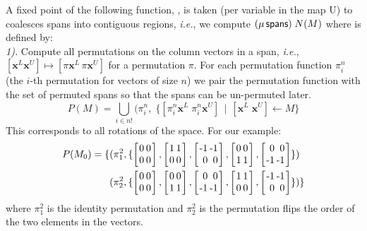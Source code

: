 \documentclass[9pt]{sigplanconf}
\theoremstyle{definition}
\newcommand{\ie}{\emph{i.e.}}
\newcommand{\vect}[1]{\textbf{#1}}
\newcommand{\vtwo}[2]{\setlength{\arraycolsep}{0em}
\left[\begin{array}{l}#1\\#2\end{array}\right]}
\newcommand{\stwo}[4]
{\setlength{\arraycolsep}{0.1em}
\left[\begin{array}{rr}$#1$ & $#3$\\$#2$ & $#4$\end{array}\right]}
\begin{document}
A fixed point of the following function, \spanOp{}, is taken (per variable
in the map U) to coalesces spans into contiguous regions, \ie{}, we compute
 $(\mu \, \textsf{spans}) \; N(M)$ where \spanOp{} is defined by: \\[-0.5em]

\noindent
\textit{1).\;} Compute all permutations on the column vectors in a span, \ie{},
  $[\vect{x}^L \vect{x}^U] \mapsto [\pi\vect{x}^L \, \pi\vect{x}^U]$
for a permutation $\pi$. For each permutation function $\pi^n_i$
(the $i$-th permutation for vectors of size $n$) we pair the
permutation function with the set of permuted spans so that
the spans can be un-permuted later.
%
\begin{equation*}
P(M) = \bigcup_{i \in n!} (\pi^n_{i} , \; \{[\pi^n_i
\vect{x}^L \; \pi^n_i\vect{x}^U] \, \mid \, [\vect{x}^L \; \vect{x}^U]
\leftarrow M\}
\end{equation*}
%
This corresponds to all rotations of the space.  For our example:
%
\begin{align*}
P(M_0) =
\{&(\pi^2_1, \{ \stwo{0}{0}{0}{0},
\stwo{1}{0}{1}{0},
\stwo{-1}{0}{-1}{0},
\stwo{0}{1}{0}{1},
\stwo{0}{-1}{0}{-1} \})
\\
&(\pi^2_2, \{
 \stwo{0}{0}{0}{0},
 \stwo{0}{1}{0}{1},
 \stwo{0}{-1}{0}{-1},
 \stwo{1}{0}{1}{0},
 \stwo{-1}{0}{-1}{0}\})\}
\end{align*}
%
where $\pi^2_1$ is the identity permutation and $\pi^2_2$ is the
permutation flips the order of the two elements in the 
vectors. \\
\end{document}
